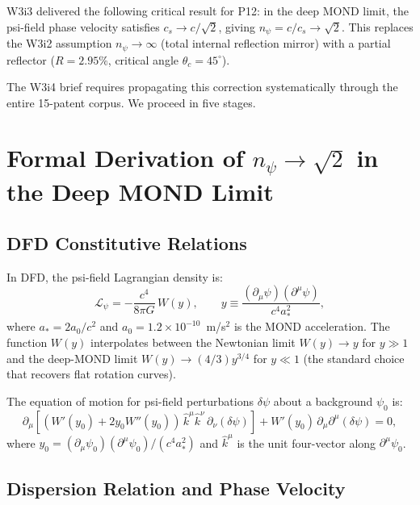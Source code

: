 \documentclass[aps,prd,twocolumn,superscriptaddress]{revtex4-2}
\newcommand{\npsi}{n_\psi}
\newcommand{\astar}{a_*}
\newcommand{\azero}{a_0}
\newcommand{\ee}[1]{\times 10^{#1}}
\begin{document}
W3i3 delivered the following critical result for P12: in the deep MOND
limit, the psi-field phase velocity satisfies $c_s \to c/\sqrt{2}$,
giving $\npsi = c/c_s \to \sqrt{2}$.  This replaces the W3i2 assumption
$\npsi \to \infty$ (total internal reflection mirror) with a partial
reflector ($R = 2.95\%$, critical angle $\theta_c = 45^\circ$).

The W3i4 brief requires propagating this correction systematically
through the entire 15-patent corpus.  We proceed in five stages.

\section{Formal Derivation of $\npsi \to \sqrt{2}$ in the Deep MOND Limit}
\label{sec:derivation}

\subsection{DFD Constitutive Relations}

In DFD, the psi-field Lagrangian density is:
\begin{equation}
\mathcal{L}_\psi = -\frac{c^4}{8\pi G}\,W(y),
\qquad
y \equiv \frac{(\partial_\mu\psi)(\partial^\mu\psi)}{c^4 \astar^2},
\label{eq:lagrangian}
\end{equation}
where $\astar = 2\azero/c^2$ and $\azero = 1.2\ee{-10}$~m/s$^2$ is the
MOND acceleration.  The function $W(y)$ interpolates between the
Newtonian limit $W(y) \to y$ for $y \gg 1$ and the deep-MOND limit
$W(y) \to (4/3)y^{3/4}$ for $y \ll 1$ (the standard choice that
recovers flat rotation curves).

The equation of motion for psi-field perturbations $\delta\psi$ about
a background $\psi_0$ is:
\begin{equation}
\partial_\mu\!\left[(W'(y_0) + 2y_0 W''(y_0))\,
  \hat{k}^\mu\hat{k}^\nu\,\partial_\nu(\delta\psi)\right]
+W'(y_0)\,\partial_\mu\partial^\mu(\delta\psi) = 0,
\label{eq:pertEOM}
\end{equation}
where $y_0 = (\partial_\mu\psi_0)(\partial^\mu\psi_0)/(c^4\astar^2)$
and $\hat{k}^\mu$ is the unit four-vector along $\partial^\mu\psi_0$.

\subsection{Dispersion Relation and Phase Velocity}
\end{document}
